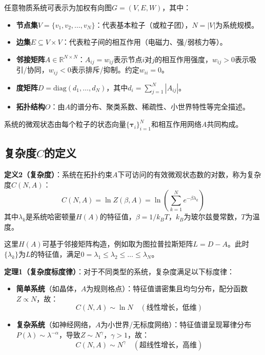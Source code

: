 \documentclass[12pt,a4paper]{article}
\theoremstyle{plain}
\newcommand{\ve}[1]{\bm{#1}}                    %
\begin{document}
任意物质系统可表示为加权有向图$G=(V,E,W)$，其中：
\begin{itemize}
    \item \textbf{节点集}$V = \{v_1, v_2, \dots, v_N\}$：代表基本粒子（或粒子团），$N = |V|$为系统规模。
    \item \textbf{边集}$E \subseteq V \times V$：代表粒子间的相互作用（电磁力、强/弱核力等）。
    \item \textbf{邻接矩阵}$A \in \mathbb{R}^{N \times N}$：$A_{ij} = w_{ij}$表示节点$i$对$j$的相互作用强度，$w_{ij}>0$表示吸引/协同，$w_{ij}<0$表示排斥/抑制。约定$w_{ii}=0$。
    \item \textbf{度矩阵}$D = \text{diag}(d_1, \dots, d_N)$，其中$d_i = \sum_{j=1}^N |A_{ij}|$。
    \item \textbf{拓扑结构}$O$：由$A$的谱分布、聚类系数、稀疏性、小世界特性等完全描述。
\end{itemize}

系统的微观状态由每个粒子的状态向量$\{\ve{\tau}_i\}_{i=1}^N$和相互作用网络$A$共同构成。

\subsection{复杂度$C$的定义}

\textbf{定义2（复杂度）}：系统在拓扑约束$A$下可访问的有效微观状态数的对数，称为复杂度$C(N,A)$：
\begin{equation}
C(N,A) = \ln Z(\beta, A) = \ln\left( \sum_{k=1}^N e^{-\beta \lambda_k} \right)
\end{equation}
其中$\lambda_k$是系统哈密顿量$H(A)$的特征值，$\beta = 1/k_B T$，$k_B$为玻尔兹曼常数，$T$为温度。

这里$H(A)$可基于邻接矩阵构造，例如取为图拉普拉斯矩阵$L = D - A$。此时$\{\lambda_k\}$为$L$的特征值，满足$0 = \lambda_1 \leq \lambda_2 \leq \dots \leq \lambda_N$。

\textbf{定理1（复杂度标度律）}：对于不同类型的系统，复杂度满足以下标度律：
\begin{itemize}
    \item \textbf{简单系统}（如晶体，$A$为规则格点）：特征值谱密集且均匀分布，配分函数$Z \propto N$，故：
    \begin{equation}
    C(N,A) \sim \ln N \quad (\text{线性增长，低维})
    \end{equation}
    \item \textbf{复杂系统}（如神经网络，$A$为小世界/无标度网络）：特征值谱呈现幂律分布$P(\lambda) \sim \lambda^{-\alpha}$，导致$Z \sim N^\gamma$，$\gamma > 1$，故：
    \begin{equation}
    C(N,A) \sim N^\gamma \quad (\text{超线性增长，高维})
    \end{equation}
\end{itemize}
\end{document}
